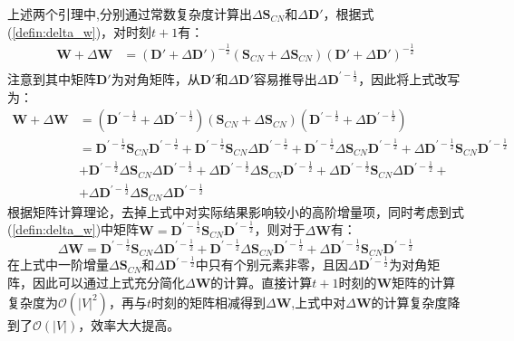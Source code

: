 上述两个引理中,分别通过常数复杂度计算出$\Delta\textbf{S}_{CN}$和$\Delta\textbf{D}'$，根据式(\ref{defin:delta_w})，对时刻$t+1$有：
\begin{equation}
	\begin{aligned}
	\textbf{W} + \Delta\textbf{W} &= (\textbf{D}'+\Delta\textbf{D}')^{-\frac{1}{2}}(\textbf{S}_{CN}+\Delta\textbf{S}_{CN})(\textbf{D}'+\Delta\textbf{D}')^{-\frac{1}{2}} \\	
	\end{aligned}
\end{equation}
注意到其中矩阵$\textbf{D}'$为对角矩阵，从$\textbf{D}'$和$\Delta\textbf{D}'$容易推导出$\Delta\textbf{D}^{\prime-\frac{1}{2}}$，因此将上式改写为：
\begin{equation}
	\begin{aligned}
	\textbf{W} + \Delta\textbf{W} &= (\textbf{D}^{\prime-\frac{1}{2}}+\Delta\textbf{D}^{\prime-\frac{1}{2}})(\textbf{S}_{CN}+\Delta\textbf{S}_{CN})(\textbf{D}^{\prime-\frac{1}{2}}+\Delta\textbf{D}^{\prime-\frac{1}{2}}) \\	
	& = \textbf{D}^{\prime-\frac{1}{2}}\textbf{S}_{CN}\textbf{D}^{\prime-\frac{1}{2}}+
	\textbf{D}^{\prime-\frac{1}{2}}\textbf{S}_{CN}\Delta\textbf{D}^{\prime-\frac{1}{2}}+
	\textbf{D}^{\prime-\frac{1}{2}}\Delta\textbf{S}_{CN}\textbf{D}^{\prime-\frac{1}{2}}+
	\Delta\textbf{D}^{\prime-\frac{1}{2}}\textbf{S}_{CN}\textbf{D}^{\prime-\frac{1}{2}}\\
	&+\textbf{D}^{\prime-\frac{1}{2}}\Delta\textbf{S}_{CN}\Delta\textbf{D}^{\prime-\frac{1}{2}}+
	\Delta\textbf{D}^{\prime-\frac{1}{2}}\Delta\textbf{S}_{CN}\textbf{D}^{\prime-\frac{1}{2}}+
	\Delta\textbf{D}^{\prime-\frac{1}{2}}\textbf{S}_{CN}\Delta\textbf{D}^{\prime-\frac{1}{2}}+\\
	&+\Delta\textbf{D}^{\prime-\frac{1}{2}}\Delta\textbf{S}_{CN}\Delta\textbf{D}^{\prime-\frac{1}{2}}
	\end{aligned}
\end{equation}
根据矩阵计算理论\cite{golub2012matrix}，去掉上式中对实际结果影响较小的高阶增量项，同时考虑到式(\ref{defin:delta_w})中矩阵$\textbf{W}= \textbf{D}^{\prime-\frac{1}{2}}\textbf{S}_{CN}\textbf{D}^{\prime-\frac{1}{2}}$，则对于$\Delta\textbf{W}$有：
\begin{equation}
	\Delta\textbf{W}= \textbf{D}^{\prime-\frac{1}{2}}\textbf{S}_{CN}\Delta\textbf{D}^{\prime-\frac{1}{2}}+
	\textbf{D}^{\prime-\frac{1}{2}}\Delta\textbf{S}_{CN}\textbf{D}^{\prime-\frac{1}{2}}+
	\Delta\textbf{D}^{\prime-\frac{1}{2}}\textbf{S}_{CN}\textbf{D}^{\prime-\frac{1}{2}}
\end{equation}
在上式中一阶增量$\Delta\textbf{S}_{CN}$和$\Delta\textbf{D}^{\prime-\frac{1}{2}}$中只有个别元素非零，且因$\Delta\textbf{D}^{\prime-\frac{1}{2}}$为对角矩阵，因此可以通过上式充分简化$\Delta\textbf{W}$的计算。直接计算$t+1$时刻的\textbf{W}矩阵的计算复杂度为$\mathcal{O}(|V|^2)$，再与$t$时刻的矩阵相减得到$\Delta\textbf{W}$,上式中对$\Delta\textbf{W}$的计算复杂度降到了$\mathcal{O}(|V|)$，效率大大提高。

